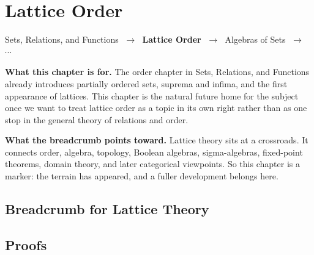 \chapter{Lattice Order}

\begin{tcolorbox}[
  colback=gray!6,
  colframe=gray!40,
  arc=2pt,
  left=8pt, right=8pt, top=6pt, bottom=6pt,
  title={\small\textbf{Where This Chapter Sits}},
  fonttitle=\small\bfseries
]
\begin{center}
\small
Sets, Relations, and Functions
$\;\to\;$ \textbf{Lattice Order}
$\;\to\;$ Algebras of Sets
$\;\to\;$ $\cdots$
\end{center}

\medskip
\noindent\textbf{What this chapter is for.}
The order chapter in Sets, Relations, and Functions already introduces
partially ordered sets, suprema and infima, and the first appearance of
lattices. This chapter is the natural future home for the subject once we want
to treat lattice order as a topic in its own right rather than as one stop in
the general theory of relations and order.

\medskip
\noindent\textbf{What the breadcrumb points toward.}
Lattice theory sits at a crossroads. It connects order, algebra, topology,
Boolean algebras, sigma-algebras, fixed-point theorems, domain theory, and
later categorical viewpoints. So this chapter is a marker: the terrain has
appeared, and a fuller development belongs here.
\end{tcolorbox}

\section{Breadcrumb for Lattice Theory}


\section*{Proofs}

